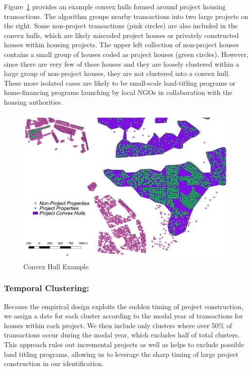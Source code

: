 \documentclass[12pt]{article}
\begin{document}
Figure~\ref{figure:conhull} provides an example convex hulls formed around project housing transactions.  The algorithm groups nearby transactions into two large projects on the right.  Some non-project transactions (pink circles) are also included in the convex hulls, which are likely miscoded project houses or privately constructed houses within housing projects.  The upper left collection of non-project houses contains a small group of houses coded as project houses (green circles).  However, since there are very few of these houses and they are loosely clustered within a large group of non-project houses, they are not clustered into a convex hull.  These more isolated cases are likely to be small-scale land-titling programs or home-financing programs launching by local NGOs in collaboration with the housing authorities.  

\begin{figure}
\caption{Convex Hull Example}\label{figure:conhull}
\centering
\includegraphics[scale=.5]{figures/convex_hull_v3_test.pdf}
\end{figure}

\subsubsection{Temporal Clustering:}  Because the empirical design exploits the sudden timing of project construction, we assign a date for each cluster according to the modal year of transactions for houses within each project.  We then include only clusters where over 50\% of transactions occur during the modal year, which excludes half of total clusters.  This approach rules out incremental projects as well as helps to exclude possible land titling programs, allowing us to leverage the sharp timing of large project construction in our identification.  
\end{document}
